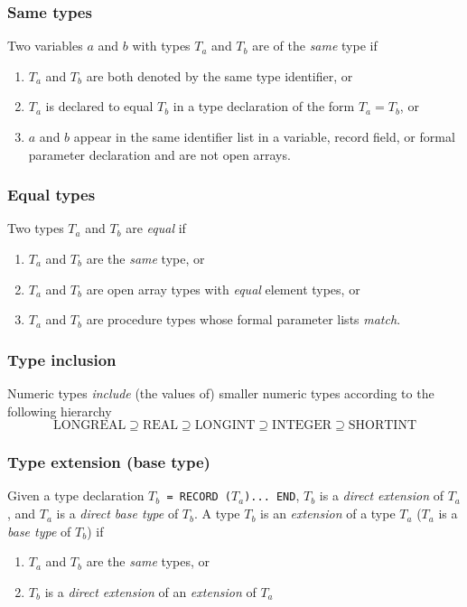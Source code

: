 \subsubsection{Same types}

Two variables $a$ and $b$ with types $T_a$ and $T_b$ are of
the {\em same} type if
\begin{enumerate}
\item
$T_a$ and $T_b$ are both denoted by the same type identifier,
or
\item
$T_a$ is declared to equal $T_b$ in a type declaration
of the form $T_a = T_b$, or
\item
$a$ and $b$ appear in the same identifier list in a
variable, record field, or formal parameter declaration and are not
open arrays.
\end{enumerate}

\subsubsection{Equal types}

Two types $T_a$ and $T_b$ are {\em equal} if
\begin{enumerate}
\item
$T_a$ and $T_b$ are the {\em same} type, or
\item
$T_a$ and $T_b$ are open array types with {\em equal} element types, or
\item
$T_a$ and $T_b$ are procedure types whose formal parameter lists {\em match}.
\end{enumerate}

\subsubsection{Type inclusion}

Numeric types {\em include} (the values of) smaller numeric types according
to the following hierarchy
$$
\mbox{LONGREAL} \supseteq
\mbox{REAL} \supseteq
\mbox{LONGINT} \supseteq
\mbox{INTEGER} \supseteq
\mbox{SHORTINT}
$$

\subsubsection{Type extension (base type)}

Given a type declaration {\tt $T_b$ = RECORD ($T_a$)... END},
$T_b$ is a {\em direct extension} of $T_a$,
and $T_a$ is a {\em direct base type} of $T_b$. A type $T_b$ is
an {\em extension} of a type $T_a$ ($T_a$ is a {\em base type} of $T_b$) if
\begin{enumerate}
\item
$T_a$ and $T_b$ are the {\em same} types, or
\item
$T_b$ is a {\em direct extension} of an {\em extension} of $T_a$
\end{enumerate}

